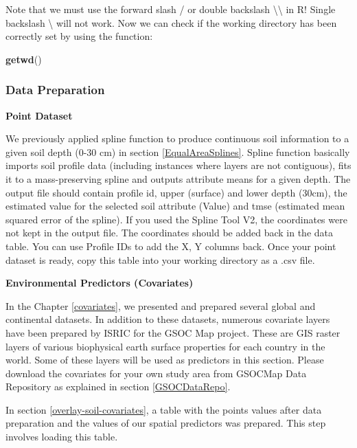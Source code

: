 \documentclass[10pt,b5paper,]{book}
\newenvironment{Shaded}{\begin{snugshade}}{\end{snugshade}}
\newcommand{\KeywordTok}[1]{\textcolor[rgb]{0.13,0.29,0.53}{\textbf{#1}}}
\newcommand{\NormalTok}[1]{#1}
\theoremstyle{definition}
\theoremstyle{definition}
\theoremstyle{definition}
\theoremstyle{remark}
\begin{document}
Note that we must use the forward slash / or double backslash
\textbackslash{}\textbackslash{} in R! Single backslash \textbackslash{}
will not work. Now we can check if the working directory has been
correctly set by using the function:

\begin{Shaded}
\begin{Highlighting}[]
\KeywordTok{getwd}\NormalTok{()}
\end{Highlighting}
\end{Shaded}

\hypertarget{data-preparation-1}{%
\subsubsection{Data Preparation}\label{data-preparation-1}}

\textbf{Point Dataset}

We previously applied spline function to produce continuous soil
information to a given soil depth (0-30 cm) in section
\ref{EqualAreaSplines}. Spline function basically imports soil profile
data (including instances where layers are not contiguous), fits it to a
mass-preserving spline and outputs attribute means for a given depth.
The output file should contain profile id, upper (surface) and lower
depth (30cm), the estimated value for the selected soil attribute
(Value) and tmse (estimated mean squared error of the spline). If you
used the Spline Tool V2, the coordinates were not kept in the output
file. The coordinates should be added back in the data table. You can
use Profile IDs to add the X, Y columns back. Once your point dataset is
ready, copy this table into your working directory as a .csv file.

\textbf{Environmental Predictors (Covariates)}

In the Chapter \ref{covariates}, we presented and prepared several
global and continental datasets. In addition to these datasets, numerous
covariate layers have been prepared by ISRIC for the GSOC Map project.
These are GIS raster layers of various biophysical earth surface
properties for each country in the world. Some of these layers will be
used as predictors in this section. Please download the covariates for
your own study area from GSOCMap Data Repository as explained in section
\ref{GSOCDataRepo}.

In section \ref{overlay-soil-covariates}, a table with the points values
after data preparation and the values of our spatial predictors was
prepared. This step involves loading this table.
\end{document}
